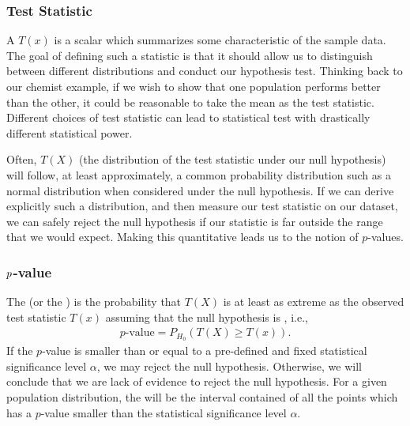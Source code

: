 \documentclass[letterpaper,11pt,english]{sphinxmanual}
\begin{document}
\subsubsection{Test Statistic}
\label{\detokenize{chapter_appendix_math/statistics:test-statistic}}
A  \(T(x)\) is a scalar which summarizes some
characteristic of the sample data. The goal of defining such a statistic
is that it should allow us to distinguish between different
distributions and conduct our hypothesis test. Thinking back to our
chemist example, if we wish to show that one population performs better
than the other, it could be reasonable to take the mean as the test
statistic. Different choices of test statistic can lead to statistical
test with drastically different statistical power.

Often, \(T(X)\) (the distribution of the test statistic under our
null hypothesis) will follow, at least approximately, a common
probability distribution such as a normal distribution when considered
under the null hypothesis. If we can derive explicitly such a
distribution, and then measure our test statistic on our dataset, we can
safely reject the null hypothesis if our statistic is far outside the
range that we would expect. Making this quantitative leads us to the
notion of \(p\)-values.


\subsubsection{\protect\(p\protect\)-value}
\label{\detokenize{chapter_appendix_math/statistics:p-value}}
The  (or the ) is the probability
that \(T(X)\) is at least as extreme as the observed test statistic
\(T(x)\) assuming that the null hypothesis is , i.e.,
\begin{equation}\label{equation:chapter_appendix_math/statistics:chapter_appendix_math/statistics:3}
\begin{split}p\text{-value} = P_{H_0}(T(X) \geq T(x)).\end{split}
\end{equation}
If the \(p\)-value is smaller than or equal to a pre-defined and
fixed statistical significance level \(\alpha\), we may reject the
null hypothesis. Otherwise, we will conclude that we are lack of
evidence to reject the null hypothesis. For a given population
distribution, the  will be the interval contained
of all the points which has a \(p\)-value smaller than the
statistical significance level \(\alpha\).
\end{document}
